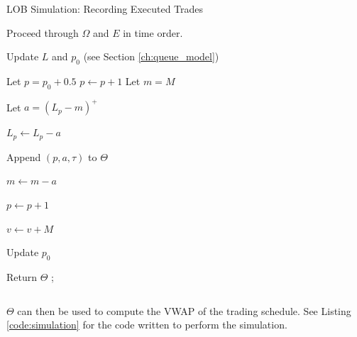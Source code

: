 \begin{algorithm}[H]
\SetAlgoLined
\caption{LOB Simulation: Recording Executed Trades}
Proceed through $\Omega$ and $E$ in time order. 

 {
     {
        Update $L$ and $p_0$ (see Section \ref{ch:queue_model}) \;
    }
     {
        Let $p = p_0 + 0.5$ \;
         {
            $p \leftarrow p + 1$
        }
        Let $m = M$ \;
         {
            Let $a = (L_p - m)^+$ \;
            
            $L_p \leftarrow L_p - a$ \;
            
            Append $(p, a, \tau)$ to $\Theta$ \;

            $m \leftarrow m - a$ \;
    
            $p \leftarrow p + 1$ \;
        }
        $v \leftarrow v + M$ \;
        
        Update $p_0$ \;
    }
}

Return $\Theta$ ;
\end{algorithm}

$$ $$

$\Theta$ can then be used to compute the VWAP of the trading schedule. See Listing \ref{code:simulation} for the code written to perform the simulation.